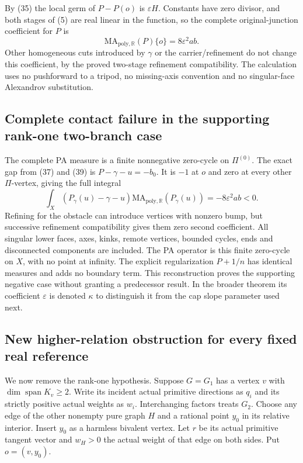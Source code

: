 \documentclass[
  11pt,
]{article}
\begin{document}
By (35) the local germ of \(P-P(o)\) is \(\varepsilon H\). Constants
have zero divisor, and both stages of (5) are real linear in the
function, so the complete original-junction coefficient for \(P\) is \[
                    \mathrm{MA}_{\mathrm{poly},\mathbb{R}}(P)\{o\}
                                  =8\varepsilon^2ab.          \tag{47}
\] Other homogeneous cuts introduced by \(\gamma\) or the
carrier/refinement do not change this coefficient, by the proved
two-stage refinement compatibility. The calculation uses no pushforward
to a tripod, no missing-axis convention and no singular-face Alexandrov
substitution.

\subsection{Complete contact failure in the supporting rank-one
two-branch
case}\label{complete-contact-failure-in-the-supporting-rank-one-two-branch-case}

The complete PA measure is a finite nonnegative zero-cycle on
\(\Pi^{(0)}\). The exact gap from (37) and (39) is \(P-\gamma-u=-b_0\).
It is \(-1\) at \(o\) and zero at every other \(\Pi\)-vertex, giving the
full integral \[
 \int_X(P_\gamma(u)-\gamma-u)
       \mathrm{MA}_{\mathrm{poly},\mathbb R}(P_\gamma(u))
                         =-8\varepsilon^2ab<0.              \tag{48}
\] Refining for the obstacle can introduce vertices with nonzero bump,
but successive refinement compatibility gives them zero second
coefficient. All singular lower faces, axes, kinks, remote vertices,
bounded cycles, ends and disconnected components are included. The PA
operator is this finite zero-cycle on \(X\), with no point at infinity.
The explicit regularization \(P+1/n\) has identical measures and adds no
boundary term. This reconstruction proves the supporting negative case
without granting a predecessor result. In the broader theorem its
coefficient \(\varepsilon\) is denoted \(\kappa\) to distinguish it from
the cap slope parameter used next.

\subsection{New higher-relation obstruction for every fixed real
reference}\label{new-higher-relation-obstruction-for-every-fixed-real-reference}

We now remove the rank-one hypothesis. Suppose \(G=G_1\) has a vertex
\(v\) with \(\dim\operatorname{span}K_v\geq2\). Write its incident
actual primitive directions as \(q_i\) and its strictly positive actual
weights as \(w_i\). Interchanging factors treats \(G_2\). Choose any
edge of the other nonempty pure graph \(H\) and a rational point \(y_0\)
in its relative interior. Insert \(y_0\) as a harmless bivalent vertex.
Let \(r\) be its actual primitive tangent vector and \(w_H>0\) the
actual weight of that edge on both sides. Put \(o=(v,y_0)\).
\end{document}
